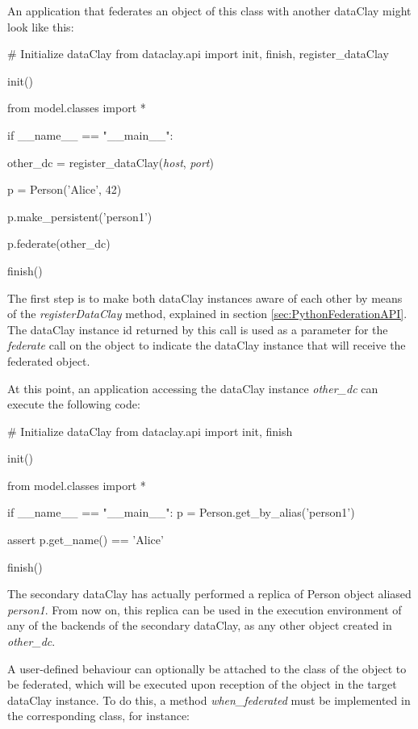 An application that federates an object of this class with another dataClay might look like this:

\begin{tBox}
\begin{python}
# Initialize dataClay
from dataclay.api import init, finish, register_dataClay

init()

from model.classes import *

if __name__ == "__main__":
   
    other_dc = register_dataClay(\textit{host}, \textit{port})
    
    p = Person('Alice', 42)

    p.make_persistent('person1')

    p.federate(other_dc)
    
    finish()
\end{python}
\end{tBox}

The first step is to make both dataClay instances aware of each other by means of the \textit{registerDataClay} method, explained in section \ref{sec:PythonFederationAPI}. The dataClay instance id returned by this call is used as a parameter for the \textit{federate} call on the object to indicate the dataClay instance that will receive the federated object. 

At this point, an application accessing the dataClay instance \textit{other\_dc} can execute the following code:

\begin{tBox}
\begin{python}
# Initialize dataClay
from dataclay.api import init, finish

init()

from model.classes import *

if __name__ == "__main__":
    p = Person.get_by_alias('person1')
    
    assert p.get\_name() == 'Alice'
    
    finish()
\end{python}
\end{tBox}

The secondary dataClay has actually performed a replica of Person object aliased \textit{person1}. From now on, this 
replica can be used in the execution environment of any of the backends of the secondary dataClay, as any other object created in \textit{other\_dc}.

A user-defined behaviour can optionally be attached to the class of the object to be federated, which will be executed upon reception of the object in the target dataClay instance. To do this, a method \textit{when\_federated} must be implemented in the corresponding class, for instance:

